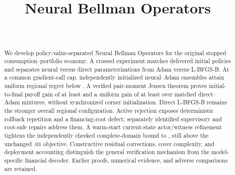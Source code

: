 \documentclass[ecta]{econsocart}
\theoremstyle{remark}
\begin{document}
\begin{frontmatter}
\title{Neural Bellman Operators}
\begin{aug}
\author[id=au1,addressref={add1}]{~}
\address[id=add1]{}
\end{aug}
\begin{abstract}
We develop policy-value-separated Neural Bellman Operators for the original stopped consumption--portfolio economy. A crossed experiment matches delivered initial policies and separates neural versus direct parameterizations from Adam versus L-BFGS-B. At a common gradient-call cap, independently initialized neural--Adam ensembles attain uniform regional regret below \RXXIINeuralRegret{}. A verified pair-moment Jensen theorem proves initial-to-final payoff gain of at least \RXXIIGainMin{} and a uniform gain of at least \RXXIIConditionalGain{} over matched direct--Adam mixtures, without synchronized corner initialization. Direct L-BFGS-B remains the stronger overall regional configuration. Active rejection exposes deterministic rollback repetition and a financing-root defect; separately identified supervisory and root-safe repairs address them. A warm-start current-state actor/witness refinement tightens the independently checked complete-domain bound to \RXXIIGlobalBound{}, still above the unchanged $.01$ objective. Constructive residual corrections, cover complexity, and deployment accounting distinguish the general verification mechanism from the model-specific financial decoder. Earlier proofs, numerical evidence, and adverse comparisons are retained.
\end{abstract}
\begin{keyword}
\end{keyword}
\end{frontmatter}

\begin{appendix}






\end{appendix}
\clearpage

\end{document}
